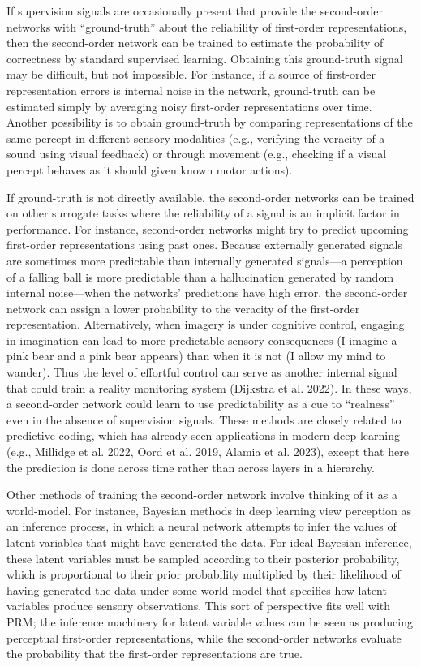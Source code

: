 \documentclass[12pt]{article}
\begin{document}
If supervision signals are occasionally present that provide the second-order networks with ``ground-truth'' about the reliability of first-order representations, then the second-order network can be trained to estimate the probability of correctness by standard supervised learning. Obtaining this ground-truth signal may be difficult, but not impossible. For instance, if a source of first-order representation errors is internal noise in the network, ground-truth can be estimated simply by averaging noisy first-order representations over time. Another possibility is to obtain ground-truth by comparing representations of the same percept in different sensory modalities (e.g., verifying the veracity of a sound using visual feedback) or through movement (e.g., checking if a visual percept behaves as it should given known motor actions).

If ground-truth is not directly available, the second-order networks can be trained on other surrogate tasks where the reliability of a signal is an implicit factor in performance. For instance, second-order networks might try to predict upcoming first-order representations using past ones. Because externally generated signals are sometimes more predictable than internally generated signals—a perception of a falling ball is more predictable than a hallucination generated by random internal noise—when the networks’ predictions have high error, the second-order network can assign a lower probability to the veracity of the first-order representation. Alternatively, when imagery is under cognitive control, engaging in imagination can lead to more predictable sensory consequences (I imagine a pink bear and a pink bear appears) than when it is not (I allow my mind to wander). Thus the level of effortful control can serve as another internal signal that could train a reality monitoring system (Dijkstra et al. 2022). In these ways, a second-order network could learn to use predictability as a cue to ``realness'' even in the absence of supervision signals. These methods are closely related to predictive coding, which has already seen applications in modern deep learning (e.g., Millidge et al. 2022, Oord et al. 2019, Alamia et al. 2023), except that here the prediction is done across time rather than across layers in a hierarchy.

Other methods of training the second-order network involve thinking of it as a world-model. For instance, Bayesian methods in deep learning view perception as an inference process, in which a neural network attempts to infer the values of latent variables that might have generated the data. For ideal Bayesian inference, these latent variables must be sampled according to their posterior probability, which is proportional to their prior probability multiplied by their likelihood of having generated the data under some world model that specifies how latent variables produce sensory observations. This sort of perspective fits well with PRM; the inference machinery for latent variable values can be seen as producing perceptual first-order representations, while the second-order networks evaluate the probability that the first-order representations are true.
\end{document}
